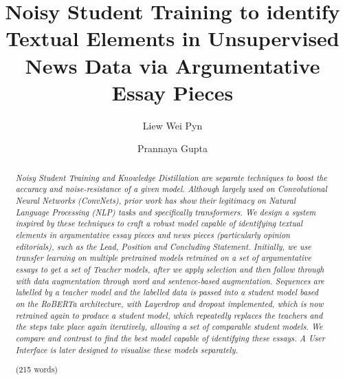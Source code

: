 \documentclass[12pt]{article}
\begin{document}


\pagestyle{fancy}
\fancyhf{}


{\selectfont
\title{
	\huge \textbf{Noisy Student Training to identify Textual Elements in Unsupervised News Data via Argumentative Essay Pieces}
}

\date{}


\author[1]{Liew Wei Pyn}
\author[1]{Prannaya Gupta}

\maketitle



\begin{abstract}
\emph{Noisy Student Training and Knowledge Distillation are separate techniques to boost the accuracy and noise-resistance of a given model. Although largely used on Convolutional Neural Networks (ConvNets), prior work has show their legitimacy on Natural Language Processing (NLP) tasks and specifically transformers. We design a system inspired by these techniques to craft a robust model capable of identifying textual elements in argumentative essay pieces and news pieces (particularly opinion editorials), such as the Lead, Position and Concluding Statement. Initially, we use transfer learning on multiple pretrained models retrained on a set of argumentative essays to get a set of Teacher models, after we apply selection and then follow through with data augmentation through word and sentence-based augmentation. Sequences are labelled by a teacher model and the labelled data is passed into a student model based on the RoBERTa architecture, with Layerdrop and dropout implemented, which is now retrained again to produce a student model, which repeatedly replaces the teachers and the steps take place again iteratively, allowing a set of comparable student models. We compare and contrast to find the best model capable of identifying these essays. A User Interface is later designed to visualise these models separately.} \\
\begin{flushright}(215 words)\end{flushright}
\end{abstract}

}
\end{document}
